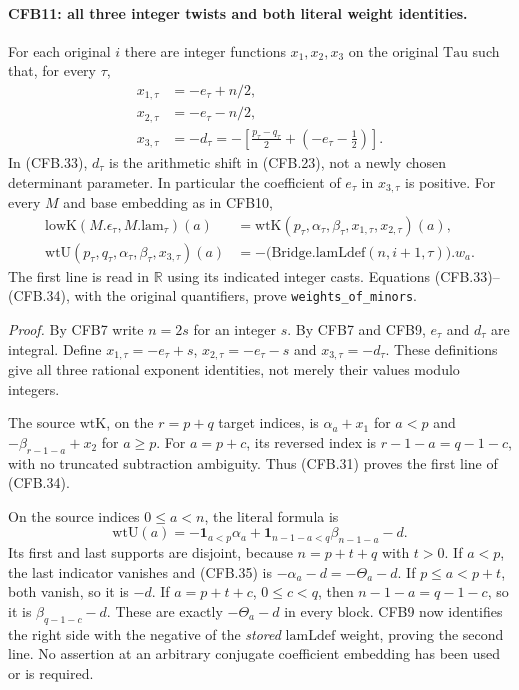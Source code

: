 \paragraph{CFB11: all three integer twists and both literal weight identities.}
\label{claim:CFB11}
For each original \(i\) there are integer functions
\(x_1,x_2,x_3\) on the original \(\mathrm{Tau}\) such that,
for every \(\tau\),
\[
 \begin{split}
       x_{1,\tau}&=-e_\tau+n/2,\\
       x_{2,\tau}&=-e_\tau-n/2,\\
       x_{3,\tau}&=-d_\tau
          =-\left[\frac{p_\tau-q_\tau}{2}
                              +\left(-e_\tau-\frac12\right)\right].
 \end{split}                                                    \tag{CFB.33}
\]
In (CFB.33), \(d_\tau\) is the arithmetic shift in (CFB.23),
not a newly chosen determinant parameter.  In particular the
coefficient of \(e_\tau\) in \(x_{3,\tau}\) is positive.
For every \(M\) and base embedding as in CFB10,
\[
 \begin{split}
 \mathrm{lowK}(M.\epsilon_\tau,M.\mathrm{lam}_\tau)(a)
     &=\mathrm{wtK}(p_\tau,\alpha_\tau,\beta_\tau,
                                      x_{1,\tau},x_{2,\tau})(a),\\
 \mathrm{wtU}(p_\tau,q_\tau,\alpha_\tau,\beta_\tau,x_{3,\tau})(a)
     &=-\bigl(\mathrm{Bridge.lamLdef}(n,i+1,\tau)\bigr).w_a.
 \end{split}                                                    \tag{CFB.34}
\]
The first line is read in \(\mathbb R\) using its indicated
integer casts.  Equations (CFB.33)--(CFB.34), with the original
quantifiers, prove \texttt{weights\_of\_minors}.

\emph{Proof.}
By CFB7 write \(n=2s\) for an integer \(s\).  By CFB7 and CFB9,
\(e_\tau\) and \(d_\tau\) are integral.  Define
\(x_{1,\tau}=-e_\tau+s\),
\(x_{2,\tau}=-e_\tau-s\) and \(x_{3,\tau}=-d_\tau\).
These definitions give all three rational exponent identities,
not merely their values modulo integers.

The source \(\mathrm{wtK}\), on the \(r=p+q\) target indices,
is \(\alpha_a+x_1\) for \(a<p\) and
\(-\beta_{r-1-a}+x_2\) for \(a\ge p\).
For \(a=p+c\), its reversed index is
\(r-1-a=q-1-c\), with no truncated subtraction ambiguity.
Thus (CFB.31) proves the first line of (CFB.34).

On the source indices \(0\le a<n\), the literal formula is
\[
 \mathrm{wtU}(a)=
     -\mathbf1_{a<p}\alpha_a
       +\mathbf1_{n-1-a<q}\beta_{n-1-a}-d.                     \tag{CFB.35}
\]
Its first and last supports are disjoint, because
\(n=p+t+q\) with \(t>0\).
If \(a<p\), the last indicator vanishes and (CFB.35) is
\(-\alpha_a-d=-\Theta_a-d\).
If \(p\le a<p+t\), both vanish, so it is \(-d\).
If \(a=p+t+c\), \(0\le c<q\), then
\(n-1-a=q-1-c\), so it is \(\beta_{q-1-c}-d\).
These are exactly \(-\Theta_a-d\) in every block.
CFB9 now identifies the right side with the negative of the
\emph{stored} \(\mathrm{lamLdef}\) weight, proving the second
line.  No assertion at an arbitrary conjugate coefficient embedding
has been used or is required.

